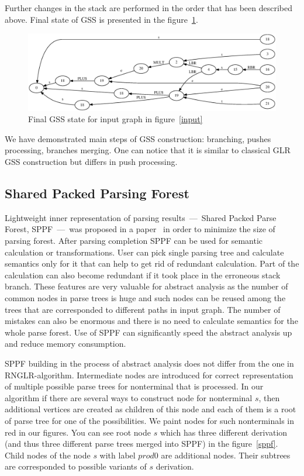 \documentclass{sigplanconf}
\begin{document}
Further changes in the stack are performed in the order that has been described above. Final state of GSS is presented in the figure~\ref{stack7}.

\begin{figure}
    \begin{center}
        \includegraphics[scale=0.5]{Graphs/stack_5_13.eps}
    \end{center}
    \caption{Final GSS state for input graph in figure~\ref{input} }
    \label{stack7}
\end{figure}

	We have demonstrated main steps of GSS construction: branching, pushes processing, branches merging. One can notice that it is similar to classical GLR GSS construction but differs in push processing.  


\subsection{Shared Packed Parsing Forest}

	Lightweight inner representation of parsing results~---~Shared Packed Parse Forest, SPPF~---~was proposed in a paper~\cite{SPPF} in order to minimize the size of parsing forest. After parsing completion SPPF can be used for semantic calculation or transformations. User can pick single parsing tree and calculate semantics only for it that can help to get rid of redundant calculation. Part of the calculation can also become redundant if it took place in the erroneous stack branch. These features are very valuable for abstract analysis as the number of common nodes in parse trees is huge and such nodes can be reused among the trees that are corresponded to different paths in input graph. The number of mistakes can also be enormous and there is no need to calculate semantics for the whole parse forest. Use of SPPF can significantly speed the abstract analysis up and reduce memory consumption. 

SPPF building in the process of abstract analysis does not differ from the one in RNGLR-algorithm. Intermediate nodes are introduced for correct representation of multiple possible parse trees for nonterminal that is processed. In our algorithm if there are several ways to construct node for nonterminal $s$, then additional vertices are created as children of this node and each of them is a root of parse tree for one of the possibilities. We paint nodes for such nonterminals in red in our figures.  You can see root node $s$ which has three different derivation (and thus three different parse trees merged into SPPF) in the figure~\ref{sppf}. Child nodes of the node $s$ with label $prod0$ are additional nodes. Their subtrees are corresponded to possible variants of $s$ derivation. 
\end{document}
